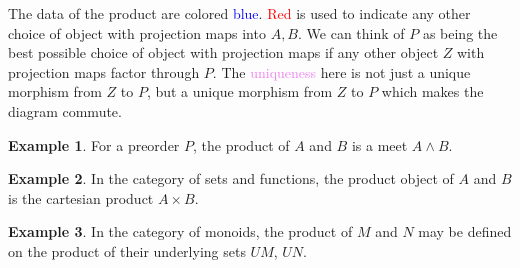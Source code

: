\documentclass[12pt]{article}
\theoremstyle{definition}
\newtheorem{example}{Example}[section]
\newcommand{\blue}[1]{\textcolor{blue}{#1}}
\newcommand{\red}[1]{\textcolor{red}{#1}}
\newcommand{\purple}[1]{\textcolor{violet}{#1}}
\begin{document}

\begin{figure}[!h]
    \centering

\end{figure}
The data of the product are colored \blue{blue}. \red{Red} is used to indicate any other choice of object with projection maps into $A,B$. We can think of $P$ as being the best possible choice of object with projection maps if any other object $Z$ with projection maps factor through $P$. The \purple{uniqueness} here is not just a unique morphism from $Z$ to $P$, but a unique morphism from $Z$ to $P$ which makes the diagram commute.

\begin{example}
    For a preorder $P$, the product of $A$ and $B$ is a meet $A \land B$.
\end{example}

\begin{example}
    In the category of sets and functions, the product object of $A$ and $B$ is the cartesian product $A \times B$.
\end{example}

\begin{example}
    In the category of monoids, the product of $M$ and $N$ may be defined on the product of their underlying sets $UM$, $UN$.
\end{example}
\end{document}
